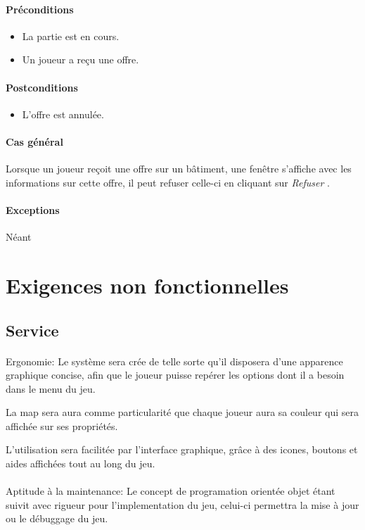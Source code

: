 \documentclass[a4paper,11pt]{report}
\begin{document}
\paragraph{Préconditions}
\begin{itemize}
 \item La partie est en cours.
 \item Un joueur a reçu une offre.
\end{itemize}
\paragraph{Postconditions}
\begin{itemize}
 \item L'offre est annulée.
\end{itemize}
\paragraph{Cas général}
Lorsque un joueur reçoit une offre sur un bâtiment, une fenêtre s'affiche avec les informations sur cette offre, il peut refuser celle-ci en cliquant sur \og \textit{Refuser} \fg.
\paragraph{Exceptions} Néant

\newpage
\section{Exigences non fonctionnelles}
\subsection{Service}
\paragraph{}Ergonomie:  \newline
Le système sera crée de telle sorte qu'il disposera d’une apparence graphique concise, afin que le joueur puisse repérer les options dont il a besoin dans le menu du jeu.

La map sera aura comme particularité que chaque joueur aura sa couleur qui sera affichée sur ses propriétés.

L'utilisation sera facilitée par l'interface graphique, grâce à des icones, boutons et aides affichées tout au long du jeu.

\paragraph{}Aptitude à la maintenance:  \newline
Le concept de programation orientée objet étant suivit avec rigueur pour l'implementation du jeu, celui-ci permettra la mise à jour ou le débuggage du jeu.
\end{document}
